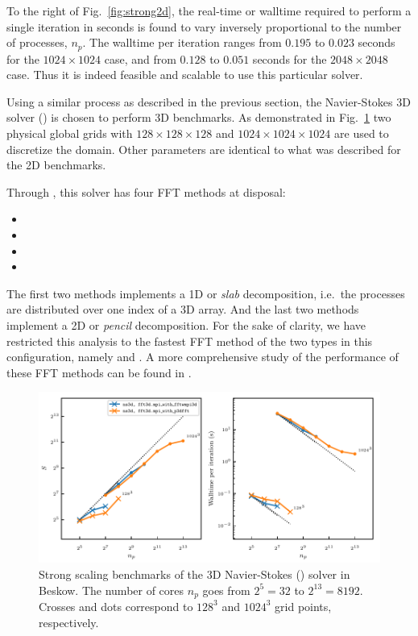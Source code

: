 To the right of Fig.~\ref{fig:strong2d}, the real-time or walltime required to
perform a single iteration in seconds is found to vary inversely proportional
to the number of processes, $n_p$. The walltime per iteration ranges from
$0.195$ to $0.023$ seconds for the $1024\times1024$ case, and from
$0.128$ to $0.051$ seconds for the $2048\times2048$ case. Thus it is indeed
feasible and scalable to use this particular solver.


Using a similar process as described in the previous section,
the Navier-Stokes 3D solver () is chosen to
perform 3D benchmarks.
%
As demonstrated in Fig.~\ref{fig:strong3d_beskow} two physical global grids
with $128\times128\times128$ and $1024\times1024\times1024$ are used to
discretize the domain.
%
Other parameters are identical to what was described for the 2D benchmarks.

Through , this solver has four FFT methods at disposal:

\begin{itemize}
 \item {}
 \item {}
 \item {}
 \item {}
\end{itemize}

The first two methods implements a 1D or \emph{slab} decomposition, i.e.\ the
processes are distributed over one index of a 3D array. And the last two
methods implement a 2D or \emph{pencil} decomposition. For the sake of clarity,
we have restricted this analysis to the fastest FFT method of the two types in
this configuration, namely  and
. A more comprehensive study of the
performance of these FFT methods can be found in \citet{fluidfft}.

\begin{figure}[htp]
\centering
\includegraphics[width=\linewidth]{tmp/fig_bench_strong3d}
\caption{Strong scaling benchmarks of the 3D Navier-Stokes
() solver in Beskow. The number of cores $n_p$
goes from $2^5 = 32$ to $2^{13} = 8192$. Crosses and dots correspond to $128^3$
and $1024^3$ grid points, respectively.}
\label{fig:strong3d_beskow}
\end{figure}

